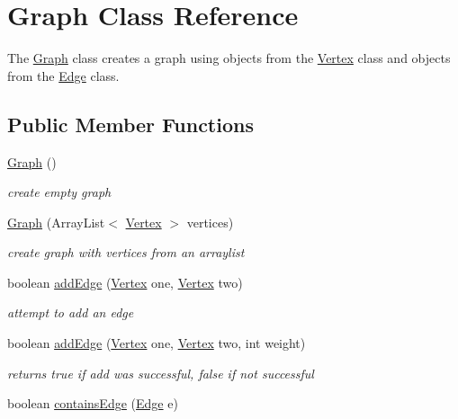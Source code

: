 \hypertarget{class_graph}{}\section{Graph Class Reference}
\label{class_graph}


The \hyperlink{class_graph}{Graph} class creates a graph using objects from the \hyperlink{class_vertex}{Vertex} class and objects from the \hyperlink{class_edge}{Edge} class.  


\subsection*{Public Member Functions}
\begin{DoxyCompactItemize}
\item 
\mbox{\label{class_graph_ab8ccb82fd216cc5a36c3887c6820428f}} 
\hyperlink{class_graph_ab8ccb82fd216cc5a36c3887c6820428f}{Graph} ()
\begin{DoxyCompactList}\small\item\em create empty graph \end{DoxyCompactList}\item 
\hyperlink{class_graph_ac1c989504f624086332f46af57861d3a}{Graph} (Array\+List$<$ \hyperlink{class_vertex}{Vertex} $>$ vertices)
\begin{DoxyCompactList}\small\item\em create graph with vertices from an arraylist \end{DoxyCompactList}\item 
boolean \hyperlink{class_graph_a50d13043a91c83bfd9d89a4ba24de12b}{add\+Edge} (\hyperlink{class_vertex}{Vertex} one, \hyperlink{class_vertex}{Vertex} two)
\begin{DoxyCompactList}\small\item\em attempt to add an edge \end{DoxyCompactList}\item 
boolean \hyperlink{class_graph_a7f18a8cf5f6fcf5c391fd02e15c7f46c}{add\+Edge} (\hyperlink{class_vertex}{Vertex} one, \hyperlink{class_vertex}{Vertex} two, int weight)
\begin{DoxyCompactList}\small\item\em returns true if add was successful, false if not successful \end{DoxyCompactList}\item 
boolean \hyperlink{class_graph_a64c719dec9e96b255fcd1a72d7f7b636}{contains\+Edge} (\hyperlink{class_edge}{Edge} e)

\end{DoxyCompactItemize}
